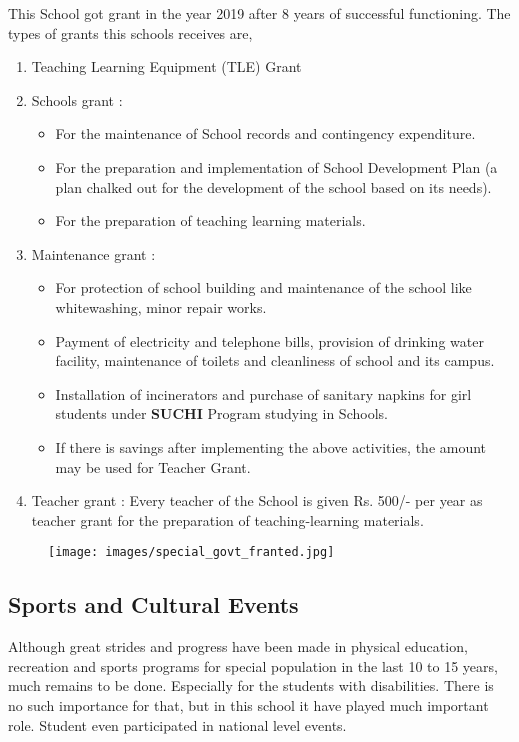 This School got grant in the year 2019 after 8 years of successful functioning. The types of grants this schools receives are,
\begin{enumerate}
    \item Teaching Learning Equipment (TLE) Grant 
    \item Schools grant :
    \begin{itemize}
        \item For the maintenance of School records and contingency expenditure.
        \item For the preparation and implementation of School Development Plan (a plan chalked out for the development of the school based on its needs).
        \item For the preparation of teaching learning materials.
    \end{itemize}
    \item Maintenance grant :
    \begin{itemize}
        \item For protection of school building and maintenance of the school like whitewashing, minor repair works.
        \item Payment of electricity and telephone bills, provision of drinking water facility,  maintenance of  toilets and cleanliness of school and its campus.
        \item Installation of incinerators and purchase of sanitary napkins for girl students under \textbf{SUCHI} Program studying in  Schools.
        \item If there is savings after implementing the above activities, the amount may be used for Teacher Grant.
    \end{itemize}
    \item Teacher grant : Every teacher of the School is given Rs. 500/- per year as teacher grant for the preparation of teaching-learning materials.
\end{enumerate}
\begin{figure}[H]
    \centering
    \texttt{[image: images/special\_govt\_franted.jpg]}
\end{figure}
\subsection{Sports and Cultural Events}
Although great strides and progress have been made in physical education, recreation and sports programs for special population in the last 10 to 15 years, much remains to be done. Especially for the students with disabilities. There is no such importance for that, but in this school it have played much important role. Student even participated in national level events. 

